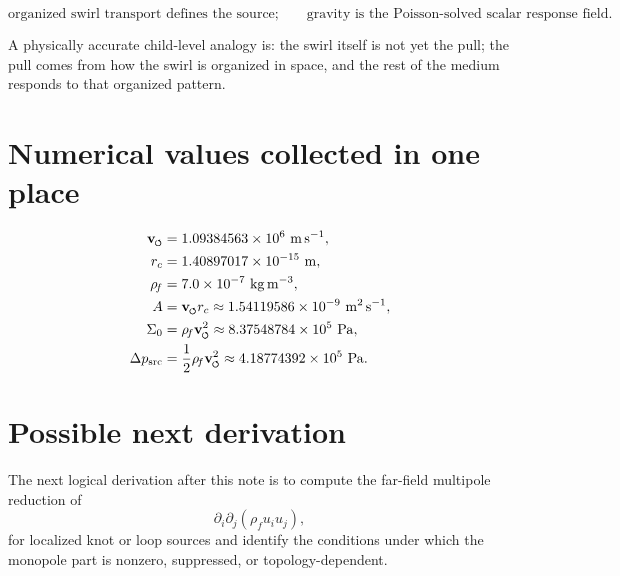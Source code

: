 \documentclass[11pt]{article}
\newcommand{\swirlarrow}{\mathchoice{\mkern-2mu\scriptstyle\boldsymbol{\circlearrowleft}}{\mkern-2mu\scriptstyle\boldsymbol{\circlearrowleft}}{\mkern-2mu\scriptscriptstyle\boldsymbol{\circlearrowleft}}{\mkern-2mu\scriptscriptstyle\boldsymbol{\circlearrowleft}}}
\newcommand{\vswirl}{\mathbf{v}_{\swirlarrow}}
\newcommand{\rhoF}{\rho_{\!f}}
\newcommand{\rc}{{r_c}}
\newcommand{\src}{\mathrm{src}}
\begin{document}
        \begin{equation}
            \boxed{
                \text{organized swirl transport defines the source;}
                \qquad
                \text{gravity is the Poisson-solved scalar response field.}
            }
        \end{equation}
        
        A physically accurate child-level analogy is: the swirl itself is not yet the pull; the pull comes from how the swirl is organized in space, and the rest of the medium responds to that organized pattern.
        
        \appendix
        
        \section{Numerical values collected in one place}
        
        \begin{align}
            \vswirl &= 1.09384563\times 10^6\ \mathrm{m\,s^{-1}},
            \\
            \rc &= 1.40897017\times 10^{-15}\ \mathrm{m},
            \\
            \rhoF &= 7.0\times 10^{-7}\ \mathrm{kg\,m^{-3}},
            \\
            A &= \vswirl \rc \approx 1.54119586\times 10^{-9}\ \mathrm{m^2\,s^{-1}},
            \\
            \Sigma_0 &= \rhoF \vswirl^2 \approx 8.37548784\times 10^5\ \mathrm{Pa},
            \\
            \Delta p_{\src} &= \frac{1}{2}\rhoF \vswirl^2 \approx 4.18774392\times 10^5\ \mathrm{Pa}.
        \end{align}
        
        \section{Possible next derivation}
        
        The next logical derivation after this note is to compute the far-field multipole reduction of
        \[
            \partial_i\partial_j(\rhoF u_i u_j),
        \]
        for localized knot or loop sources and identify the conditions under which the monopole part is nonzero, suppressed, or topology-dependent.
        
\end{document}
